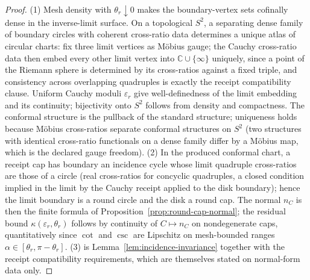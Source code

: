 \documentclass[11pt]{article}
\begin{document}
\begin{proof}
(1) Mesh density with \(\theta_r\downarrow0\) makes the boundary-vertex sets
cofinally dense in the inverse-limit surface. On a topological \(S^2\), a
separating dense family of boundary circles with coherent cross-ratio data
determines a unique atlas of circular charts: fix three limit vertices as
M\"obius gauge; the Cauchy cross-ratio data then embed every other limit
vertex into \(\mathbb C\cup\{\infty\}\) uniquely, since a point of the Riemann
sphere is determined by its cross-ratios against a fixed triple, and
consistency across overlapping quadruples is exactly the receipt
compatibility clause. Uniform Cauchy moduli \(\varepsilon_r\) give
well-definedness of the limit embedding and its continuity; bijectivity onto
\(S^2\) follows from density and compactness. The conformal structure is the
pullback of the standard structure; uniqueness holds because M\"obius
cross-ratios separate conformal structures on \(S^2\) (two structures with
identical cross-ratio functionals on a dense family differ by a M\"obius map,
which is the declared gauge freedom).
(2) In the produced conformal chart, a receipt cap has boundary an incidence
cycle whose limit quadruple cross-ratios are those of a circle (real
cross-ratios for concyclic quadruples, a closed condition implied in the limit
by the Cauchy receipt applied to the disk boundary); hence the limit boundary
is a round circle and the disk a round cap. The normal \(n_C\) is then the
finite formula of Proposition~\ref{prop:round-cap-normal}; the residual bound
\(\kappa(\varepsilon_r,\theta_r)\) follows by continuity of
\(C\mapsto n_C\) on nondegenerate caps, quantitatively since
\(\cot\) and \(\csc\) are Lipschitz on mesh-bounded ranges
\(\alpha\in[\theta_r,\pi-\theta_r]\).
(3) is Lemma~\ref{lem:incidence-invariance} together with the receipt
compatibility requirements, which are themselves stated on normal-form data
only.
\end{proof}
\end{document}
